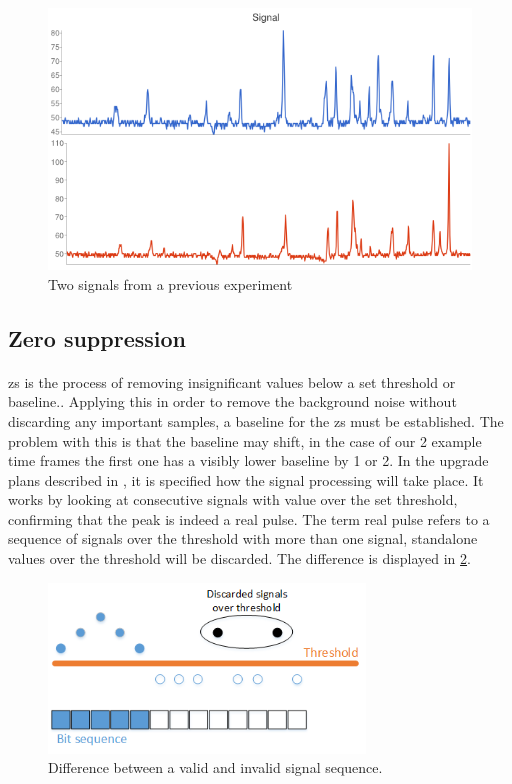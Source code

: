 \documentclass[a4paper, 12pt]{report}
\begin{document}
\begin{figure}[t]
	\centering
		\includegraphics[width=1.0\textwidth]{images/signal.png}
		\caption{Two signals from a previous experiment}
		\label{fig:signal}
\end{figure}

\subsection{Zero suppression} 
\paragraph{}
\gls{zs} is the process of removing insignificant values below a set threshold or baseline.\cite{zerosuppression}.
Applying this in order to remove the background noise without discarding any important samples, a baseline for the \gls{zs} must be established.
The problem with this is that the baseline may shift, in the case of our 2 example time frames the first one has a visibly lower baseline by 1 or 2.
In the upgrade plans described in \cite{tdr-015}, it is specified how the signal processing will take place.
It works by looking at consecutive signals with value over the set threshold, confirming that the peak is indeed a real pulse.
The term real pulse refers to a sequence of signals over the threshold with more than one signal, standalone values over the threshold will be discarded.
The difference is displayed in \ref{fig:minseq}.

\begin{figure}[h!]
	\centering
		\includegraphics[width=0.75\textwidth]{images/minseq.png}
		\caption{Difference between a valid and invalid signal sequence.}
		\label{fig:minseq}
\end{figure}
\end{document}
